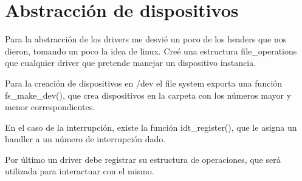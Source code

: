 \section{Abstracción de dispositivos}

Para la abstracción de los drivers me desvié un poco de los headers que nos
dieron, tomando un poco la idea de linux. Creé una estructura file_operations
que cualquier driver que pretende manejar un dispositivo instancia.

Para la creación de dispositivos en /dev el file system exporta una función
fs\_make\_dev(), que crea dispositivos en la carpeta con los números mayor y
menor correspondientes.

En el caso de la interrupción, existe la función idt_register(), que le asigna
un handler a un número de interrupción dado.

Por último un driver debe registrar su estructura de operaciones, que será
utilizada para interactuar con el mismo.
